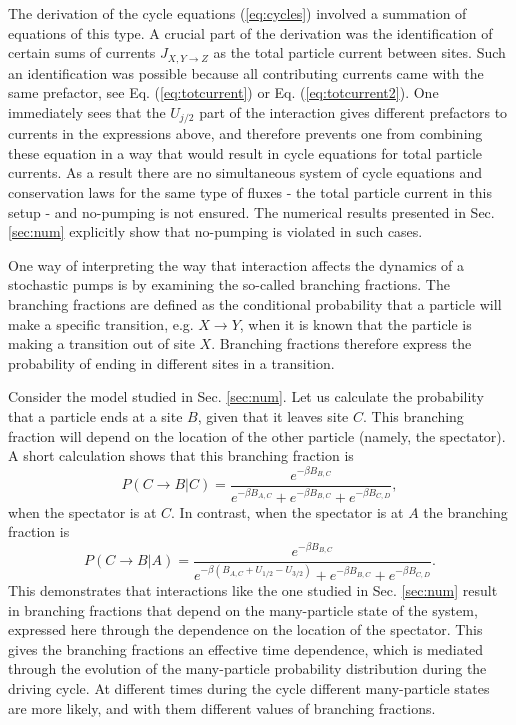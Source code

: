 \documentclass[aps,pre,showpacs,amsmath,amssymb,amsfonts,superscriptaddress,onecolumn,longbibliography]{revtex4-1}
\begin{document}
The derivation of the cycle equations (\ref{eq:cycles}) involved a summation of equations of this type. A crucial part of the derivation was
the identification of certain sums of currents $J_{X,Y\rightarrow Z}$ as the total particle current between sites. Such an identification was possible
because all contributing currents came with the same prefactor, see Eq. (\ref{eq:totcurrent}) or Eq. (\ref{eq:totcurrent2}). One immediately sees
that the $U_{j/2}$ part of the interaction gives different prefactors to currents in the expressions above, and therefore
prevents one from combining these equation in a way that would result in cycle equations for total particle currents. As a result there are no simultaneous
system of cycle equations and conservation laws for the same type of fluxes - the total particle current in this setup - and no-pumping is not ensured. The numerical results presented in Sec. \ref{sec:num}
explicitly show that no-pumping is violated in such cases.

One way of interpreting the way that interaction affects the dynamics of a stochastic pumps is by examining the so-called
branching fractions. The branching fractions are defined as the conditional probability that a particle will make
a specific transition, e.g. $X \rightarrow Y$, when it is known that the particle is making a transition out of site $X$. Branching fractions therefore express the probability
of ending in different sites in a transition.

Consider the model studied in Sec. \ref{sec:num}. Let us calculate the probability that a particle ends at a site $B$, given that
it leaves site $C$. This branching fraction will depend on the location of the other particle (namely, the spectator).
A short calculation shows that this branching fraction is
\begin{equation*}
  P(C\rightarrow B|C)=\frac{e^{-\beta B_{B,C}}}{e^{-\beta B_{A,C}}+e^{-\beta B_{B,C}}+e^{-\beta B_{C,D}}},
\end{equation*}
when the spectator is at $C$. In contrast, when the spectator is at $A$ the branching fraction
is
\begin{equation*}
  P(C\rightarrow B|A)=\frac{e^{-\beta B_{B,C}}}{e^{-\beta \left(B_{A,C}+U_{1/2}-U_{3/2} \right)}+e^{-\beta B_{B,C}}+e^{-\beta B_{C,D}}}.
\end{equation*}
This demonstrates that interactions like the one studied in Sec. \ref{sec:num} result in branching fractions that depend on the many-particle state
of the system, expressed here through the dependence on the location of the spectator.
This gives the branching fractions an effective time dependence, which is mediated through the evolution
of the many-particle probability distribution during the driving cycle. At different times during the cycle different
many-particle states are more likely, and with them different values of branching fractions.
\end{document}
